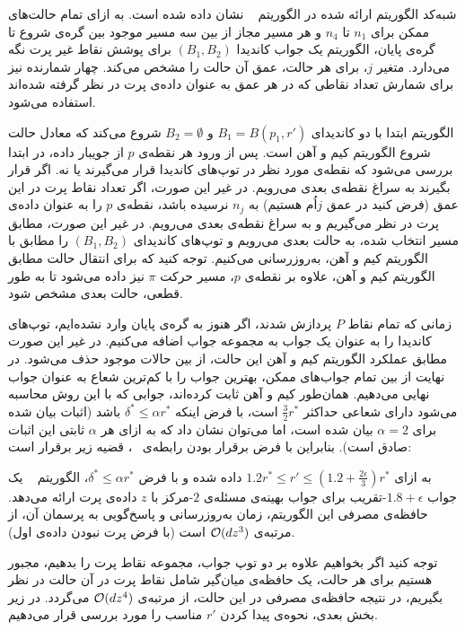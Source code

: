 شبه‌کد الگوریتم ارائه شده در الگوریتم ~ نشان داده شده است.
به ازای تمام حالت‌های ممکن برای $n_1$ تا $n_4$ و هر مسیر مجاز از بین سه مسیر موجود بین گره‌ی شروع تا گره‌ی پایان، الگوریتم یک جواب کاندیدا $(B_1, B_2)$ برای پوشش نقاط غیر پرت نگه می‌دارد.
متغیر $j$، برای هر حالت، عمق آن حالت را مشخص می‌کند.
چهار شمارنده نیز برای شمارش تعداد نقاطی که در هر عمق به عنوان داده‌ی پرت در نظر گرفته شده‌اند استفاده می‌شود.

الگوریتم ابتدا با دو کاندیدای $B_1 = B(p_1, r')$ و $B_2 = \emptyset$ شروع می‌کند که معادل حالت شروع الگوریتم کیم و آهن است.
پس از ورود هر نقطه‌ی $p$ از جویبار داده، در ابتدا بررسی می‌شود که نقطه‌ی مورد نظر در توپ‌های کاندیدا قرار می‌گیرند یا نه.
اگر قرار بگیرند به سراغ نقطه‌ی بعدی می‌رویم.
در غیر این صورت، اگر تعداد نقاط پرت در این عمق (فرض کنید در عمق $j$اُم هستیم) به $n_j$ نرسیده باشد، نقطه‌ی $p$ را به عنوان داده‌ی پرت در نظر می‌گیریم و به سراغ نقطه‌ی بعدی می‌رویم.
در غیر این صورت، مطابق مسیر انتخاب شده، به حالت بعدی می‌رویم و توپ‌های کاندیدای $(B_1, B_2)$ را مطابق با الگوریتم کیم و آهن، به‌روزرسانی می‌کنیم.
توجه کنید که برای انتقال حالت مطابق الگوریتم کیم و آهن، علاوه بر نقطه‌ی $p$، مسیر حرکت $\pi$ نیز داده می‌شود تا به طور قطعی، حالت بعدی مشخص شود.

زمانی که تمام نقاط $P$ پردازش شدند، اگر هنوز به گره‌ی پایان وارد نشده‌ایم، توپ‌های کاندیدا را به عنوان یک جواب به مجموعه جواب اضافه می‌کنیم.
در غیر این صورت مطابق عملکرد الگوریتم کیم و آهن این حالت، از بین حالات موجود حذف می‌شود.
در نهایت از بین تمام جواب‌های ممکن، بهترین جواب را با کم‌ترین شعاع به عنوان جواب نهایی می‌دهیم.
همان‌طور کیم و آهن  ثابت کرده‌اند، جوابی که با این روش محاسبه می‌شود دارای شعاعی حداکثر $\frac{3}{2}r^*$ است، با فرض اینکه $\delta^* \leq \alpha r^*$ باشد (اثبات بیان شده برای $\alpha = 2$ بیان شده است، اما می‌توان نشان داد که به ازای هر $\alpha$ ثابتی این اثبات صادق است).
بنابراین با فرض برقرار بودن رابطه‌ی ~، قضیه زیر برقرار است:


به ازای $1.2r^* \leq r' \leq (1.2 + \frac{2\epsilon}{3})r^*$ داده شده و با فرض $\delta^* \leq \alpha r^*$، الگوریتم ~ یک جواب $1.8 + \epsilon$-تقریب برای جواب بهینه‌ی مسئله‌ی $2$-مرکز با $z$ داده‌ی پرت ارائه می‌دهد.
حافظه‌ی مصرفی این الگوریتم، زمان به‌روزرسانی و پاسخ‌گویی به پرسمان آن، از مرتبه‌ی $\mathcal{O}(dz^3)$ است (با فرض پرت نبودن داده‌ی اول).


توجه کنید اگر بخواهیم علاوه بر دو توپ جواب، مجموعه نقاط پرت را بدهیم، مجبور هستیم برای هر حالت، یک حافظه‌ی میان‌گیر شامل نقاط پرت در آن حالت در نظر بگیریم، در نتیجه حافظه‌ی مصرفی در این حالت، از مرتبه‌ی $\mathcal{O}(dz^4)$ می‌گردد.
در زیر بخش بعدی، نحوه‌ی پیدا کردن $r'$ مناسب را مورد بررسی قرار می‌دهیم.

